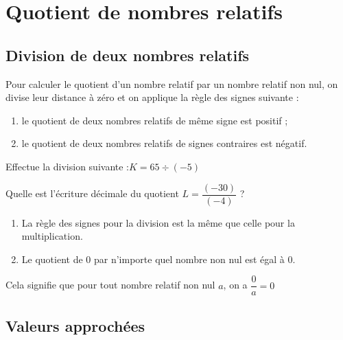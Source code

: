 \documentclass[a4paper,10pt]{report}
\begin{document}
\newpage
\setcounter{chapter}{2}
\chapter{Quotient de nombres relatifs}

\section{Division de deux nombres relatifs}

\begin{memento}
Pour calculer le quotient d'un nombre relatif par un nombre relatif non nul, on divise leur distance à zéro et on applique la règle des signes suivante :
\begin{enumerate}
\item[•] le quotient de deux nombres relatifs de même signe est positif ;
\item[•] le quotient de deux nombres relatifs de signes contraires est négatif.
\end{enumerate}
\end{memento}

\begin{ex}
Effectue la division suivante :$ K=65 \div (-5)$

\noindent\grandscarreaux{\linewidth}{4cm}
\end{ex}

\begin{ex}
Quelle est l'écriture décimale du quotient $L=\dfrac{(-30)}{(-4)}$ ?

\noindent\grandscarreaux{\linewidth}{4cm}
\end{ex}

\begin{rem}
\begin{enumerate}
\item[•] La règle des signes pour la division est la même que celle pour la multiplication.
\item[•] Le quotient de $0$ par n'importe quel nombre non nul est égal à $0$.
\end{enumerate}
\end{rem}

Cela signifie que pour tout nombre relatif non nul $a$, on a $\dfrac{0}{a}=0$

\section{Valeurs approchées}
\end{document}
